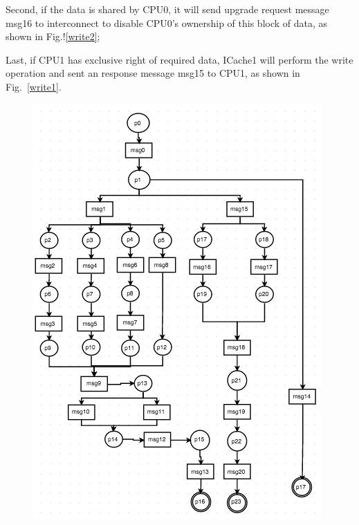 \documentclass[conference]{IEEEtran}
\begin{document}
Second, if the data is shared by CPU0, it will send upgrade request message msg16 to interconnect to disable CPU0's ownership of this block of data, as shown in Fig.!\ref{write2}; 

Last, if CPU1 has exclusive right of required data, ICache1 will perform the write operation and sent an response message msg15 to CPU1, as shown in Fig.~\ref{write1}.


\begin{figure} 
 \centerline{
 \includegraphics[width=3.4In]{figures/Fig5.png}}
 

\end{figure}
\end{document}
